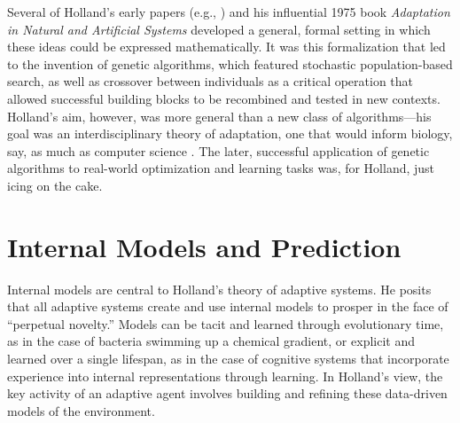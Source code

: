 \documentclass{sig-alternate}
\begin{document}
Several of Holland's early papers (e.g.,
\cite{Holland1962,Holland1973}) and his influential 1975 book
\emph{Adaptation in Natural and Artificial Systems} \cite{Holland1975}
developed a general, formal setting in which these ideas could be
expressed mathematically.  It was this formalization that led to the
invention of genetic algorithms, which featured stochastic
population-based search, as well as crossover between individuals as a
critical operation that allowed successful building blocks to be
recombined and tested in new contexts.  Holland's aim, however, was
more general than a new class of algorithms---his goal was an
interdisciplinary theory of adaptation, one that would inform biology, 
say, as much as computer science \cite{Christiansen1998}.  The later, successful application of
genetic algorithms to real-world optimization and learning tasks was,
for Holland, just icing on the cake.





\section{Internal Models and Prediction}


Internal models are central to Holland's theory of adaptive systems.
He posits that all adaptive systems create and use internal models to
prosper in the face of ``perpetual novelty.'' 
Models can be tacit and learned through evolutionary
time, as in the case of bacteria swimming up a chemical gradient, or
explicit and learned over a single lifespan, as in the case of
cognitive systems that incorporate experience into internal
representations through learning.  In Holland's view, the key activity
of an adaptive agent involves building and refining these data-driven
models of the environment.
\end{document}
